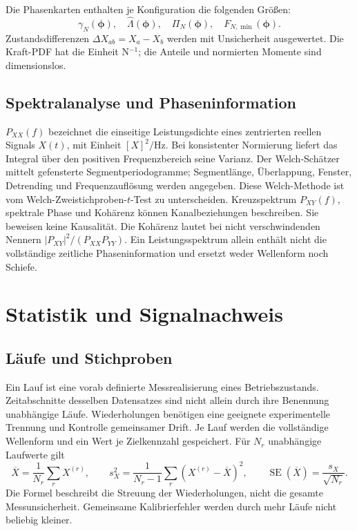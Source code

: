 \documentclass[11pt,a4paper]{article}
\newcommand{\SE}{\operatorname{SE}}
\begin{document}
Die Phasenkarten enthalten je Konfiguration die folgenden Größen:
\[\gamma_N(\boldsymbol\phi),\quad\hat\Lambda(\boldsymbol\phi),\quad\Pi_N(\boldsymbol\phi),\quad F_{N,\min}(\boldsymbol\phi).\] Zustandsdifferenzen $\Delta X_{ab}=X_a-X_b$ werden mit Unsicherheit ausgewertet. Die Kraft-PDF hat die Einheit N$^{-1}$; die Anteile und normierten Momente sind dimensionslos.


\subsection{Spektralanalyse und Phaseninformation}
$P_{XX}(f)$ bezeichnet die einseitige Leistungsdichte eines zentrierten reellen Signals $X(t)$, mit Einheit $[X]^2/\mathrm{Hz}$. Bei konsistenter Normierung liefert das Integral über den positiven Frequenzbereich seine Varianz. Der Welch-Schätzer mittelt gefensterte Segmentperiodogramme; Segmentlänge, Überlappung, Fenster, Detrending und Frequenzauflösung werden angegeben. Diese Welch-Methode ist vom Welch-Zweistichproben-$t$-Test zu unterscheiden.
Kreuzspektrum $P_{XY}(f)$, spektrale Phase und Kohärenz können Kanalbeziehungen beschreiben. Sie beweisen keine Kausalität. Die Kohärenz lautet bei nicht verschwindenden Nennern $|P_{XY}|^2/(P_{XX}P_{YY})$. Ein Leistungsspektrum allein enthält nicht die vollständige zeitliche Phaseninformation und ersetzt weder Wellenform noch Schiefe.

\section{Statistik und Signalnachweis}\label{sec:statistik}
\subsection{Läufe und Stichproben}
Ein Lauf ist eine vorab definierte Messrealisierung eines Betriebszustands. Zeitabschnitte desselben Datensatzes sind nicht allein durch ihre Benennung unabhängige Läufe. Wiederholungen benötigen eine geeignete experimentelle Trennung und Kontrolle gemeinsamer Drift. Je Lauf werden die vollständige Wellenform und ein Wert je Zielkennzahl gespeichert.
Für $N_r$ unabhängige Laufwerte gilt
\begin{equation}
\overline X=\frac1{N_r}\sum_r X^{(r)},\qquad
s_X^2=\frac1{N_r-1}\sum_r(X^{(r)}-\overline X)^2,\qquad
\SE(\overline X)=\frac{s_X}{\sqrt{N_r}}.
\end{equation}
Die Formel beschreibt die Streuung der Wiederholungen, nicht die gesamte Messunsicherheit. Gemeinsame Kalibrierfehler werden durch mehr Läufe nicht beliebig kleiner.
\end{document}
